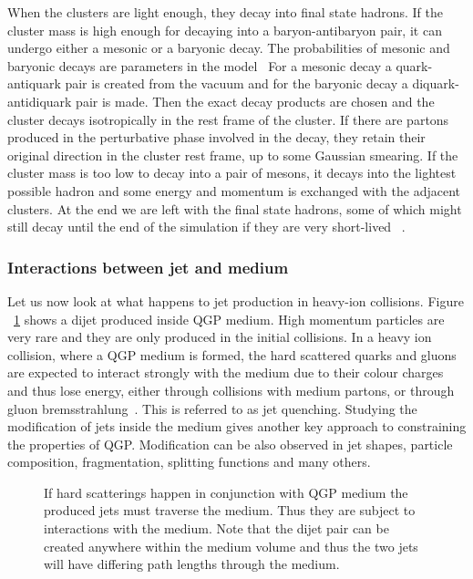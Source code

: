 When the clusters are light enough, they decay into final state hadrons. If the cluster mass is high enough for decaying into a baryon-antibaryon pair, it can undergo either a mesonic or a baryonic decay. The probabilities of mesonic and baryonic decays are parameters in the model~\cite{herwigManual}
For a mesonic decay a quark-antiquark pair is created from the vacuum and for the baryonic decay a diquark-antidiquark pair is made. Then the exact decay products are chosen and the cluster decays isotropically in the rest frame of the cluster. If there are partons produced in the perturbative phase involved in the decay, they retain their original direction in the cluster rest frame, up to some Gaussian smearing. If the cluster mass is too low to decay into a pair of mesons, it decays into the lightest possible hadron and some energy and momentum is exchanged with the adjacent clusters. At the end we are left with the final state hadrons, some of which might still decay until the end of the simulation if they are very short-lived~\cite{herwigManual} .

\subsubsection{Interactions between jet and medium}
Let us now look at what happens to jet production in heavy-ion collisions. Figure ~\ref{fig:jetq} shows a dijet produced inside QGP medium. High momentum particles are very rare and they are only produced in the initial collisions. In a heavy ion collision, where a QGP medium is formed, the hard scattered quarks and gluons are expected to interact strongly with the medium due to their colour charges and thus lose energy, either through collisions with medium partons, or through gluon bremsstrahlung~\cite{Connors:2017ptx}. This is referred to as jet quenching.  Studying the modification of jets inside the medium gives another key approach to constraining the properties of QGP. Modification can be also observed in jet shapes, particle composition, fragmentation, splitting functions and many others.


\begin{figure}
\centering

\caption{If hard scatterings happen in conjunction with QGP medium the produced jets must traverse the medium. Thus they are subject to interactions with the medium. Note that the dijet pair can be created anywhere within the medium volume and thus the two jets will have differing path lengths through the medium.}
\label{fig:jetq}
\end{figure}

